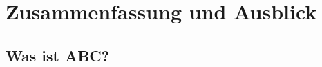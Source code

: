 \chapter{Zusammenfassung und Ausblick}\label{ch:conclusion}





\section{Was ist ABC?}

\blindtext

\blindtext
